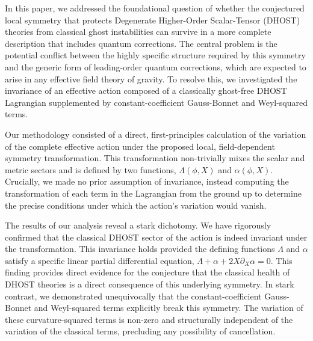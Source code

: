 \documentclass[twocolumn]{aastex631}
\begin{document}
In this paper, we addressed the foundational question of whether the conjectured local symmetry that protects Degenerate Higher-Order Scalar-Tensor (DHOST) theories from classical ghost instabilities can survive in a more complete description that includes quantum corrections. The central problem is the potential conflict between the highly specific structure required by this symmetry and the generic form of leading-order quantum corrections, which are expected to arise in any effective field theory of gravity. To resolve this, we investigated the invariance of an effective action composed of a classically ghost-free DHOST Lagrangian supplemented by constant-coefficient Gauss-Bonnet and Weyl-squared terms.

Our methodology consisted of a direct, first-principles calculation of the variation of the complete effective action under the proposed local, field-dependent symmetry transformation. This transformation non-trivially mixes the scalar and metric sectors and is defined by two functions, $\Lambda(\phi, X)$ and $\alpha(\phi, X)$. Crucially, we made no prior assumption of invariance, instead computing the transformation of each term in the Lagrangian from the ground up to determine the precise conditions under which the action's variation would vanish.

The results of our analysis reveal a stark dichotomy. We have rigorously confirmed that the classical DHOST sector of the action is indeed invariant under the transformation. This invariance holds provided the defining functions $\Lambda$ and $\alpha$ satisfy a specific linear partial differential equation, $\Lambda + \alpha + 2X \partial_X \alpha = 0$. This finding provides direct evidence for the conjecture that the classical health of DHOST theories is a direct consequence of this underlying symmetry. In stark contrast, we demonstrated unequivocally that the constant-coefficient Gauss-Bonnet and Weyl-squared terms explicitly break this symmetry. The variation of these curvature-squared terms is non-zero and structurally independent of the variation of the classical terms, precluding any possibility of cancellation.
\end{document}
